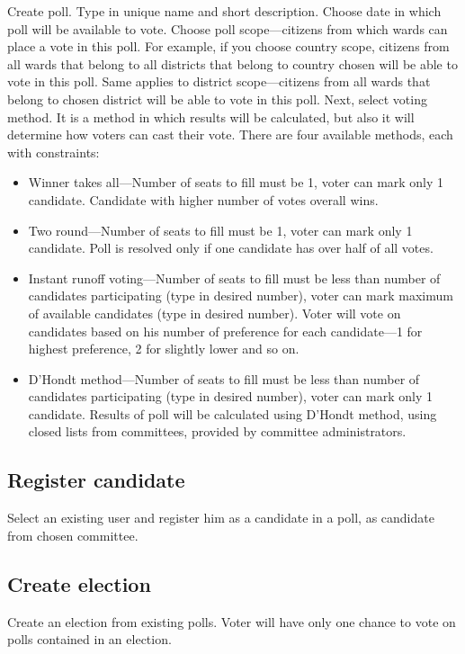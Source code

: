 \documentclass[a4paper,twoside,12pt]{book}
\begin{document}
      Create poll. Type in unique name and short description. Choose date in which poll will be available to vote.
      Choose poll scope---citizens from which wards can place a vote in this poll.
      For example, if you choose country scope, citizens from all wards that belong to all districts that belong to country chosen will be able to vote in this poll.
      Same applies to district scope---citizens from all wards that belong to chosen district will be able to vote in this poll.
      Next, select voting method. It is a method in which results will be calculated, but also it will determine how voters can cast their vote.
      There are four available methods, each with constraints:
      \begin{itemize}
        \item Winner takes all---Number of seats to fill must be 1, voter can mark only 1 candidate. Candidate with higher number of votes overall wins.
        \item Two round---Number of seats to fill must be 1, voter can mark only 1 candidate. Poll is resolved only if one candidate has over half of all votes.
        \item Instant runoff voting---Number of seats to fill must be less than number of candidates participating (type in desired number),
        voter can mark maximum of available candidates (type in desired number).
        Voter will vote on candidates based on his number of preference for each candidate---1 for highest preference, 2 for slightly lower and so on.
        \item D'Hondt method---Number of seats to fill must be less than number of candidates participating (type in desired number),
        voter can mark only 1 candidate. Results of poll will be calculated using D'Hondt method, using closed lists from committees, provided by committee administrators.
      \end{itemize}

    \subsection{Register candidate}
      Select an existing user and register him as a candidate in a poll, as candidate from chosen committee.

    \subsection{Create election}
      Create an election from existing polls. Voter will have only one chance to vote on polls contained in an election.
\end{document}
